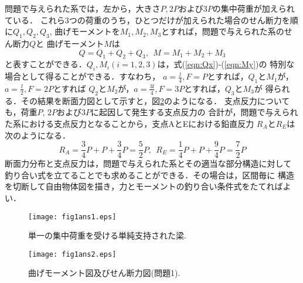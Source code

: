 \documentclass[10pt,a4j]{jarticle}
\begin{document}
問題で与えられた系では，左から，大きさ$P,2P$および$3P$の集中荷重が加えられている．
これら3つの荷重のうち，ひとつだけが加えられた場合のせん断力を順に$Q_1, Q_2,Q_3$, 
曲げモーメントを$M_1, M_2, M_3$とすれば，問題で与えられた系のせん断力$Q$と
曲げモーメント$M$は
\begin{equation}
	Q=Q_1+Q_2+Q_3, \ \ 
	M=M_1+M_2+M_3
	\label{eqn:}
\end{equation}
と表すことができる．$Q_i,M_i(i=1,2,3)$は，式(\ref{eqn:Qx})-(\ref{eqn:My})の
特別な場合として得ることができる．すなわち，
$a=\frac{l}{4}, F=P$とすれば，$Q_1$と$M_1$が，$a=\frac{l}{2}, F=2P$とすれば
$Q_2$と$M_2$が，$a=\frac{3l}{4}, F=3P$とすれば，$Q_3$と$M_3$が
得られる．その結果を断面力図として示すと，図\ref{fig:fig1_2}のようになる．
支点反力についても，荷重$P$, $2P$および$3P$に起因して発生する支点反力の
合計が，問題で与えられた系における支点反力となることから，支点AとEにおける鉛直反力
$R_A$と$R_E$は次のようになる．
\begin{equation}
	R_A=\frac{3}{4}P+ P + \frac{3}{4}P=\frac{5}{2}P, \ \ 
	R_E=\frac{1}{4}P+ P + \frac{9}{4}P=\frac{7}{2}P
	\label{eqn:Rs_prb1}
\end{equation}
断面力分布と支点反力は，問題で与えられた系とその適当な部分構造に対して
釣り合い式を立てることでも求めることができる．その場合は，区間毎に
構造を切断して自由物体図を描き，力とモーメントの釣り合い条件式をたてればよい．
\begin{figure}[h]
	\begin{center}
	\texttt{[image: fig1ans1.eps]} 
	\end{center}
	\caption{単一の集中荷重を受ける単純支持された梁.} 
	\label{fig:fig1_1}
\end{figure}
\begin{figure}[h]
	\begin{center}
	\texttt{[image: fig1ans2.eps]} 
	\end{center}
	\caption{曲げモーメント図及びせん断力図(問題1).} 
	\label{fig:fig1_2}
\end{figure}
\end{document}
